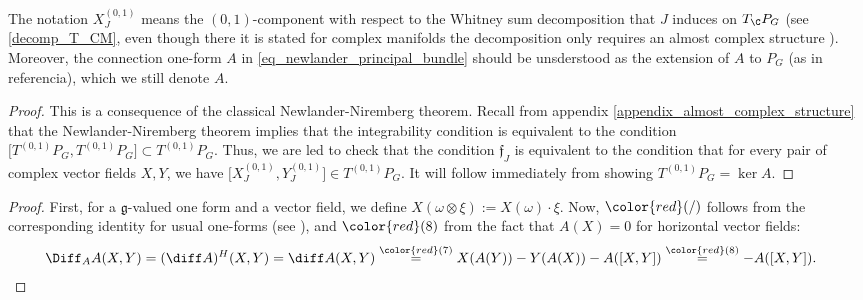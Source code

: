 The notation \(X_J^{(0,1)}\) means the \((0,1)\)-component with respect to the Whitney sum decomposition that \(J\) induces on \(T_\C P_G\) (see \eqref{decomp_T_CM}, even though there it is stated for complex manifolds the decomposition only requires an almost complex structure \parencite[Lemma 1.60]{lee_introCM}). Moreover, the connection one-form \(A\) in \eqref{eq_newlander_principal_bundle} should be unsderstood as the extension of \(A\) to \(P_G\) (as in {\color{red} referencia}), which we still denote \(A\).
\begin{proof}
    This is a consequence of the classical Newlander-Niremberg theorem. Recall from appendix \ref{appendix_almost_complex_structure} that the Newlander-Niremberg theorem implies that the integrability condition is equivalent to the condition \(\big[T^{(0,1)}P_G, T^{(0,1)}P_G\big]\subset T^{(0,1)}P_G\). Thus, we are led to check that the condition \(\mathfrak{f}_J\) is equivalent to the condition that for every pair of complex vector fields \(X,Y\), we have \(\big[X_J^{(0,1)}, Y_J^{(0,1)}\big] \in T^{(0,1)}P_G\). It will follow immediately from showing \(T^{(0,1)}P_G=\ker A\).
\end{proof}

\begin{proof}
    First, for a \(\mathfrak{g}\)-valued one form and a vector field, we define \(X(\omega \otimes \xi):=X(\omega)\cdot \xi\). Now, \(\color{red}(/)\) follows from the corresponding identity for usual one-forms (see \parencite[Prop. 14.29]{lee_introSM}), and \(\color{red}(8)\) from the fact that \(A(X)=0\) for horizontal vector fields: 
    \begin{align*}
    \Diff_A A(X,Y) & = (\diff A)^H(X,Y)=\diff A(X,Y) \overset{{\color{red}(7)}}{=}X(A(Y))-Y(A(X))-A([X,Y]) \overset{{\color{red}(8)}}{=}-A([X,Y]).
    \end{align*}
\end{proof}

